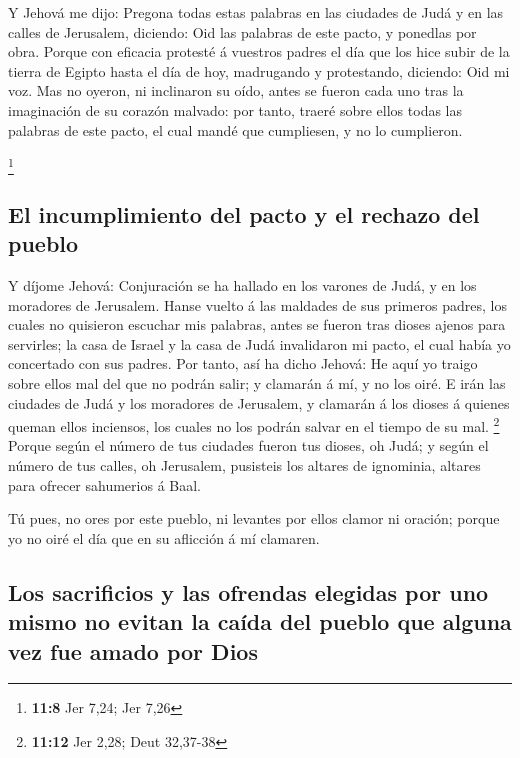  Y Jehová me dijo: Pregona todas estas palabras en las
ciudades de Judá y en las calles de Jerusalem, diciendo: Oid las
palabras de este pacto, y ponedlas por obra.  Porque con
eficacia protesté á vuestros padres el día que los hice subir de la
tierra de Egipto hasta el día de hoy, madrugando y protestando,
diciendo: Oid mi voz.  Mas no oyeron, ni inclinaron su oído,
antes se fueron cada uno tras la imaginación de su corazón malvado: por
tanto, traeré sobre ellos todas las palabras de este pacto, el cual
mandé que cumpliesen, y no lo cumplieron.

\footnote{\textbf{11:8} Jer 7,24; Jer 7,26}

\hypertarget{el-incumplimiento-del-pacto-y-el-rechazo-del-pueblo}{%
\subsection{El incumplimiento del pacto y el rechazo del
pueblo}\label{el-incumplimiento-del-pacto-y-el-rechazo-del-pueblo}}

 Y díjome Jehová: Conjuración se ha hallado en los varones
de Judá, y en los moradores de Jerusalem.  Hanse vuelto á
las maldades de sus primeros padres, los cuales no quisieron escuchar
mis palabras, antes se fueron tras dioses ajenos para servirles; la casa
de Israel y la casa de Judá invalidaron mi pacto, el cual había yo
concertado con sus padres.  Por tanto, así ha dicho Jehová:
He aquí yo traigo sobre ellos mal del que no podrán salir; y clamarán á
mí, y no los oiré.  E irán las ciudades de Judá y los
moradores de Jerusalem, y clamarán á los dioses á quienes queman ellos
inciensos, los cuales no los podrán salvar en el tiempo de su mal.
\footnote{\textbf{11:12} Jer 2,28; Deut 32,37-38}  Porque
según el número de tus ciudades fueron tus dioses, oh Judá; y según el
número de tus calles, oh Jerusalem, pusisteis los altares de ignominia,
altares para ofrecer sahumerios á Baal.

 Tú pues, no ores por este pueblo, ni levantes por ellos
clamor ni oración; porque yo no oiré el día que en su aflicción á mí
clamaren.

\hypertarget{los-sacrificios-y-las-ofrendas-elegidas-por-uno-mismo-no-evitan-la-cauxedda-del-pueblo-que-alguna-vez-fue-amado-por-dios}{%
\subsection{Los sacrificios y las ofrendas elegidas por uno mismo no
evitan la caída del pueblo que alguna vez fue amado por
Dios}\label{los-sacrificios-y-las-ofrendas-elegidas-por-uno-mismo-no-evitan-la-cauxedda-del-pueblo-que-alguna-vez-fue-amado-por-dios}}

